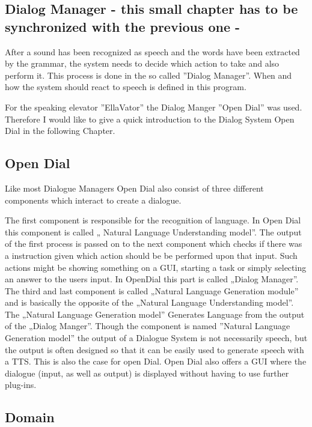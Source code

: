 \subsection{Dialog Manager - this small chapter has to be synchronized with the previous one - }

After a sound has been recognized as speech and the words have been extracted by the grammar, the system needs to decide which action to take and also perform it.
This process is done in the so called ”Dialog Manager”. When and how the system should react to speech is defined in this program.

For the speaking elevator ”EllaVator” the Dialog Manger ”Open Dial” was used.
Therefore I would like to give a quick introduction to the Dialog System Open Dial in the following Chapter.

\subsection{Open Dial}

Like most Dialogue Managers Open Dial also consist of three different components which interact to create a dialogue. 

The first component is responsible for the recognition of language. 
In Open Dial this component is called „ Natural Language Understanding model”. 
The output of the first process is passed on to the next component which checks if there was a instruction given which action should be  be performed upon that input. 
Such actions might be showing something on a GUI, starting a task or simply selecting an answer to the users input. 
In OpenDial this part is called „Dialog Manager”.
The third and last component is called „Natural Language Generation module” and is basically the opposite of the „Natural Language Understanding model”. 
The „Natural Language Generation model” Generates Language from the output of the „Dialog Manger”. 
Though the component is named ”Natural Language Generation model” the output of a Dialogue System is not necessarily speech, but the output is often designed so that it can be easily used to generate speech with a TTS. 
This is also the case for open Dial. 
Open Dial also offers a GUI where the dialogue (input, as well as output) is displayed without having to use further plug-ins.

\subsection{Domain}

